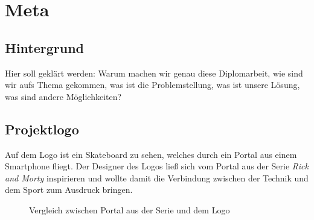 \chapter{Meta}

\section{Hintergrund}

Hier soll geklärt werden: Warum machen wir genau diese Diplomarbeit, wie sind wir aufs Thema gekommen,
was ist die Problemstellung, was ist unsere Lösung, was sind andere Möglichkeiten?

\section{Projektlogo}

Auf dem Logo ist ein Skateboard zu sehen, welches durch ein Portal aus einem Smartphone fliegt.
Der Designer des Logos ließ sich vom Portal aus der Serie \textit{Rick and Morty} inspirieren und wollte damit die Verbindung zwischen
der Technik und dem Sport zum Ausdruck bringen.



\begin{figure}[H]
    \centering
    \hfill
    \hfill
    \hfill
    \caption{Vergleich zwischen Portal aus der Serie und dem Logo}
\end{figure}